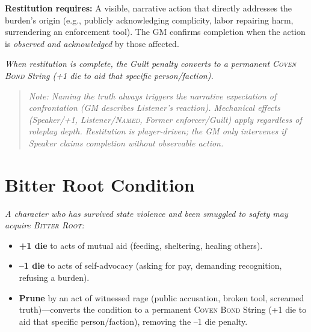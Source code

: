 \documentclass[11pt]{book}
\newcommand{\ledger}[1]{\textsc{#1}}
\begin{document}
\textbf{Restitution requires:} A visible, narrative action that directly addresses the burden's origin (e.g., publicly acknowledging complicity, labor repairing harm, surrendering an enforcement tool). The GM confirms completion when the action is \textit{observed and acknowledged} by those affected.

\textit{When restitution is complete, the Guilt penalty converts to a permanent \ledger{Coven Bond} String (+1 die to aid that specific person/faction).}

\begin{quote}
\textit{Note: Naming the truth always triggers the narrative expectation of confrontation (GM describes Listener's reaction). Mechanical effects (Speaker/+1, Listener/\ledger{Named}, Former enforcer/Guilt) apply \textit{regardless} of roleplay depth. Restitution is player-driven; the GM only intervenes if Speaker claims completion without observable action.}
\end{quote}
\section*{Bitter Root Condition}
\textit{A character who has survived state violence and been smuggled to safety may acquire \ledger{Bitter Root}:}
\begin{itemize}
  \item \textbf{+1 die} to acts of mutual aid (feeding, sheltering, healing others).
  \item \textbf{--1 die} to acts of self-advocacy (asking for pay, demanding recognition, refusing a burden).
  \item \textbf{Prune} by an act of witnessed rage (public accusation, broken tool, screamed truth)---converts the condition to a permanent \ledger{Coven Bond} String (+1 die to aid that specific person/faction), removing the --1 die penalty.
\end{itemize}


\end{document}
